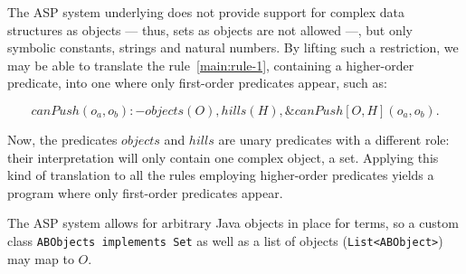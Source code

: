 The ASP system underlying \ah does not provide support for complex data structures as objects --- thus, sets as objects are not allowed ---, but only symbolic constants, strings and natural numbers.
By lifting such a restriction, we may be able to translate the rule~\eqref{main:rule-1}, containing a higher-order predicate, into one where only first-order predicates appear, such as:

$$ canPush(o_a,o_b) :- objects(O), hills(H), \&canPush[O,H](o_a,o_b). \label{main:rule-2} $$







Now, the predicates $objects$ and $hills$ are unary predicates with a different role: their interpretation will only contain one complex object, a set.
Applying this kind of translation to all the rules employing higher-order predicates yields a program where only first-order predicates appear.



The ASP system \al allows for arbitrary Java objects in place for terms, so a custom class \texttt{ABObjects implements Set} as well as a list of objects (\texttt{List<ABObject>}) may map to $O$.


